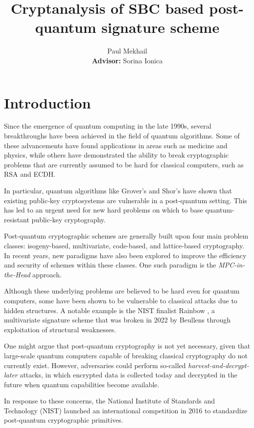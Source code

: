 \documentclass[english]{article}
\author{Paul Mekhail\\ \textbf{Advisor:} Sorina Ionica}
\title{Cryptanalysis of SBC based post-quantum signature scheme}
\begin{document}
	\maketitle
	
	\section{Introduction}
		Since the emergence of quantum computing in the late 1990s, several breakthroughs have been achieved in the field of quantum algorithms. Some of these advancements have found applications in areas such as medicine and physics, while others have demonstrated the ability to break cryptographic problems that are currently assumed to be hard for classical computers, such as RSA and ECDH.
		
		In particular, quantum algorithms like Grover's \cite{Grover} and Shor's \cite{Shor} have shown that existing public-key cryptosystems are vulnerable in a post-quantum setting. This has led to an urgent need for new hard problems on which to base quantum-resistant public-key cryptography.
		
		Post-quantum cryptographic schemes are generally built upon four main problem classes: isogeny-based, multivariate, code-based, and lattice-based cryptography. In recent years, new paradigms have also been explored to improve the efficiency and security of schemes within these classes. One such paradigm is the \emph{MPC-in-the-Head} approach.
		
		Although these underlying problems are believed to be hard even for quantum computers, some have been shown to be vulnerable to classical attacks due to hidden structures. A notable example is the NIST finalist Rainbow \cite{JD05}, a multivariate signature scheme that was broken in 2022 by Beullens \cite{Beu22} through exploitation of structural weaknesses.
	
		
		One might argue that post-quantum cryptography is not yet necessary, given that large-scale quantum computers capable of breaking classical cryptography do not currently exist. However, adversaries could perform so-called \emph{harvest-and-decrypt-later} attacks, in which encrypted data is collected today and decrypted in the future when quantum capabilities become available.
		
		In response to these concerns, the National Institute of Standards and Technology (NIST) launched an international competition in 2016 to standardize post-quantum cryptographic primitives.
	
\end{document}

